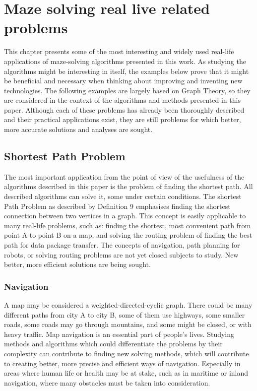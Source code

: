 \chapter{Maze solving real live related problems}\label{cha:background}
This chapter presents some of the most interesting and widely used real-life applications of maze-solving algorithms presented in this work. 
As studying the algorithms might be interesting in itself, the examples below prove that it might be beneficial and necessary when thinking about 
improving and inventing new technologies. The following examples are largely based on Graph Theory, so they are considered in the context of 
the algorithms and methods presented in this paper. Although each of these problems has already been thoroughly described and their practical 
applications exist, they are still problems for which better, more accurate solutions and analyses are sought.
\section{Shortest Path Problem}
The most important application from the point of view of the usefulness of the algorithms described in this paper is the problem of finding the shortest path.
All described algorithms can solve it, some under certain conditions. The shortest Path Problem as described by Definition 9 emphasises
finding the shortest connection between two vertices in a graph. This concept is easily applicable to many real-life problems, such as: finding the shortest, most
convenient path from point A to point B on a map, and solving the routing problem of finding the best path for data package transfer. The concepts of navigation, 
path planning for robots, or solving routing problems are not yet closed subjects to study. New better, more efficient solutions are being sought. 
\subsection{Navigation}
A map may be considered a weighted-directed-cyclic graph. There could be many different paths from city A to city B, some of them use highways, some smaller 
roads, some roads may go through mountains, and some might be closed, or with heavy traffic. Map navigation is an essential part of people's lives. 
Studying methods and algorithms which could differentiate the problems by their complexity can contribute to finding new solving methods, which will contribute 
to creating better, more precise and efficient ways of navigation. Especially in areas where human life or health may be at stake, such as in maritime or inland 
navigation, where many obstacles must be taken into consideration.\cite{Bałdyga}
